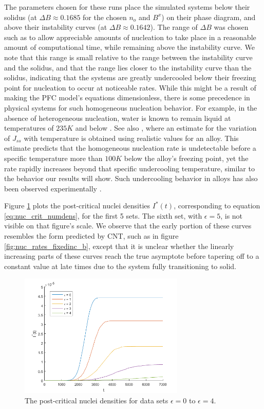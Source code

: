 The parameters chosen for these runs place the simulated systems below their solidus (at $\Delta B \approx 0.1685$ for the chosen $n_o$ and $B^x$) on their phase diagram, and above their instability curves (at $\Delta B \approx 0.1642$). The range of $\Delta B$ was chosen such as to allow appreciable amounts of nucleation to take place in a reasonable amount of computational time, while remaining above the instability curve. We note that this range is small relative to the range between the instability curve and the solidus, and that the range lies closer to the instability curve than the solidus, indicating that the systems are greatly undercooled below their freezing point for nucleation to occur at noticeable rates. While this might be a result of making the PFC model's equations dimensionless, there is some precedence in physical systems for such homogeneous nucleation behavior. For example, in the absence of heterogeneous nucleation, water is known to remain liquid at temperatures of $235K$ and below \cite{mason58,jeffery97}. See also \cite{hoyt_phasetransf}, where an estimate for the variation of $J_{ss}$ with temperature is obtained using realistic values for an alloy. This estimate predicts that the homogeneous nucleation rate is undetectable before a specific temperature more than $100K$ below the alloy's freezing point, yet the rate rapidly increases beyond that specific undercooling temperature, similar to the behavior our results will show. Such undercooling behavior in alloys has also been observed experimentally \cite{provatas_coms2}.

Figure \ref{fig:res_I_datasets} plots the post-critical nuclei densities $I^*(t)$, corresponding to equation \ref{eq:nuc_crit_numdens}, for the first 5 sets. The sixth set, with $\epsilon=5$, is not visible on that figure's scale. We observe that the early portion of these curves resembles the form predicted by CNT, such as in figure \ref{fig:nuc_rates_fixedinc_b}, except that it is unclear whether the linearly increasing parts of these curves reach the true asymptote before tapering off to a constant value at late times due to the system fully transitioning to solid.

\begin{figure}[!h]
	\centering
	\includegraphics[width=0.7\textwidth]{fig_res/res_I_datasets}
	\caption{The post-critical nuclei densities for data sets $\epsilon=0$ to $\epsilon=4$.}\label{fig:res_I_datasets}
\end{figure}

